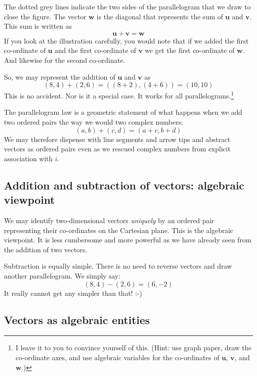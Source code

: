 \documentclass[
  a4paper,
]{article}
\begin{document}
The dotted grey lines indicate the two sides of the parallelogram that
we draw to close the figure. The vector \(\mathbf{w}\) is the diagonal
that represents the sum of \(\mathbf{u}\) and \(\mathbf{v}\). This sum
is written as \[
\mathbf{u} + \mathbf{v} = \mathbf{w}
\] If you look at the illustration carefully, you would note that if we
added the first co-ordinate of \(\mathbf{u}\) and the first co-ordinate
of \(\mathbf{v}\) we get the first co-ordinate of \(\mathbf{w}\). And
likewise for the second co-ordinate.

So, we may represent the addition of \(\mathbf{u}\) and \(\mathbf{v}\)
as \[
(8, 4) + (2, 6) = ((8+2), (4+6)) = (10, 10)
\] This is no accident. Nor is it a special case. It works for all
parallelograms.\footnote{I leave it to you to convince yourself of this.
  (Hint: use graph paper, draw the co-ordinate axes, and use algebraic
  variables for the co-ordinates of \(\mathbf{u}\), \(\mathbf{v}\), and
  \(\mathbf{w}\).)}

The parallelogram law is a geometric statement of what happens when we
add two ordered pairs the way we would two complex numbers: \[
(a, b) + (c, d) = (a+c, b+d)
\] We may therefore dispense with line segments and arrow tips and
abstract vectors as ordered pairs even as we rescued complex numbers
from explicit association with \(i\).

\hypertarget{addition-and-subtraction-of-vectors-algebraic-viewpoint}{%
\subsection{Addition and subtraction of vectors: algebraic
viewpoint}\label{addition-and-subtraction-of-vectors-algebraic-viewpoint}}

We may identify two-dimensional vectors \emph{uniquely} by an ordered
pair representing their co-ordinates on the Cartesian plane. This is the
algebraic viewpoint. It is less cumbersome and more powerful as we have
already seen from the addition of two vectors.

Subtraction is equally simple. There is no need to reverse vectors and
draw another parallelogram. We simply say: \[
(8, 4) - (2, 6) = (6, -2)
\] It really cannot get any simpler than that! :-)

\hypertarget{vectors-as-algebraic-entities}{%
\subsection{Vectors as algebraic
entities}\label{vectors-as-algebraic-entities}}
\end{document}
